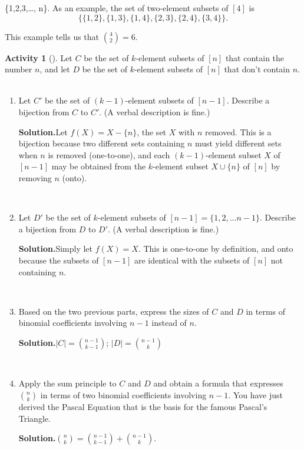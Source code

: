 \documentclass[10pt,]{book}
\theoremstyle{plain}
\theoremstyle{definition}
\newtheorem{activity}[project]{Activity}
\numberwithin{equation}{chapter}
\begin{document}
\{1,2,3,\ldots, n\}\). As an example, the set of two-element subsets of \([4]\) is%
\begin{equation*}
\{\{1,2\}, \{1,3\}, \{1,4\}, \{2,3\}, \{2,4\}, \{3,4\}\}.
\end{equation*}
%
\par
This example tells us that \({4\choose 2} = 6\).%
\begin{activity}[]\label{Pascal}
Let \(C\) be the set of \(k\)-element subsets of \([n]\) that contain the number \(n\), and let \(D\) be the set of \(k\)-element subsets of \([n]\) that don't contain \(n\).%
~\par
\begin{enumerate}[label=(\alph*)]
 \item Let \(C'\) be the set of \((k-1)\)-element subsets of \([n-1]\).  Describe a bijection from \(C\) to \(C'\).  (A verbal description is fine.)%
\par\medskip\noindent%
\textbf{Solution.}\quad Let \(f(X) = X-\{n\}\), the set \(X\) with \(n\) removed. This is a bijection because two different sets containing \(n\) must yield different sets when \(n\) is removed (one-to-one), and each \((k-1)\)-element subset \(X\) of \([n-1]\) may be obtained from the \(k\)-element subset \(X\cup \{n\}\) of \([n]\) by removing \(n\) (onto).%

~\par
\item Let \(D'\) be the set of \(k\)-element subsets of \([n-1]=\{1,2,\ldots n-1\}\).  Describe a bijection from \(D\) to \(D'\). (A verbal description is fine.)%
\par\medskip\noindent%
\textbf{Solution.}\quad Simply let \(f(X) =X\). This is one-to-one by definition, and onto because the subsets of \([n-1]\) are identical with the subsets of \([n]\) not containing \(n\).%

~\par
\item Based on the two previous parts, express the sizes of \(C\) and \(D\) in terms of binomial coefficients involving \(n-1\) instead of \(n\).%
\par\medskip\noindent%
\textbf{Solution.}\quad \(|C|= {n-1\choose k-1}\); \(|D| = {n-1\choose k}\)%

~\par
\item Apply the sum principle to \(C\) and \(D\) and obtain a formula that expresses \(n\choose k\) in terms of two binomial coefficients involving \(n-1\).  You have just derived the Pascal Equation that is the basis for the famous Pascal's Triangle.%
\par\medskip\noindent%
\textbf{Solution.}\quad \({n\choose k} = {n-1\choose k-1} +{n-1\choose k}\).%

\end{enumerate}
\end{activity}
\typeout{************************************************}
\typeout{************************************************}
\end{document}
